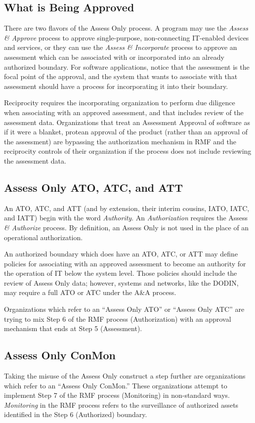 \subsection{What is Being Approved}
There are two flavors of the Assess Only process. A program may use the \textit{Assess \& Approve} process to approve single-purpose, non-connecting IT-enabled devices and services, or they can use the \textit{Assess \& Incorporate} process to approve an assessment which can be associated with or incorporated into an already authorized boundary.\autocite[\pno~11]{20240212:vaglia2017} For software applications, notice that the assessment is the focal point of the approval, and the system that wants to associate with that assessment should have a process for incorporating it into their boundary.

Reciprocity requires the incorporating organization to perform due diligence when associating with an approved assessment, and that includes review of the assessment data. Organizations that treat an Assessment Approval of software as if it were a blanket, protean approval of the product (rather than an approval of the assessment) are bypassing the authorization mechanism in RMF and the reciprocity controls of their organization if the process does not include reviewing the assessment data.

\subsection{Assess Only ATO, ATC, and ATT}
An ATO, ATC, and ATT (and by extension, their interim cousins, IATO, IATC, and IATT) begin with the word \textit{Authority}. An \textit{Authorization} requires the Assess \textit{\& Authorize} process. By definition, an Assess Only is not used in the place of an operational authorization.

An authorized boundary which does have an ATO, ATC, or ATT may define policies for associating with an approved assessment to become an authority for the operation of IT below the system level. Those policies should include the review of Assess Only data; however, systems and networks, like the DODIN, may require a full ATO or ATC under the A\&A process.\autocite{20240212:disncpg}

Organizations which refer to an ``Assess Only ATO'' or ``Assess Only ATC'' are trying to mix Step 6 of the RMF process (Authorization) with an approval mechanism that ends at Step 5 (Assessment).

\subsection{Assess Only ConMon}
Taking the misuse of the Assess Only construct a step further are organizations which refer to an ``Assess Only ConMon.'' These organizations attempt to implement Step 7 of the RMF process (Monitoring) in non-standard ways. \textit{Monitoring} in the RMF process refers to the surveillance of authorized assets identified in the Step 6 (Authorized) boundary.\autocite{20240212:nist80037rev2}


